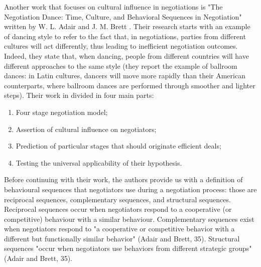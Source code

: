 \documentclass[../main.tex]{subfiles}
\begin{document}
Another work that focuses on cultural influence in negotiations is "The Negotiation Dance: Time, Culture, and Behavioral Sequences in Negotiation" written by W. L. Adair and J. M. Brett \cite{adair}. Their research starts with an example of dancing style to refer to the fact that, in negotiations, parties from different cultures will act differently, thus leading to inefficient negotiation outcomes. Indeed, they state that, when dancing, people from different countries will have different approaches to the same style (they report the example of ballroom dances: in Latin cultures, dancers will move more rapidly than their American counterparts, where ballroom dances are performed through smoother and lighter steps). Their work in divided in four main parts:
\begin{enumerate}
\item Four stage negotiation model;
\item Assertion of cultural influence on negotiators;
\item Prediction of particular stages that should originate efficient deals;
\item Testing the universal applicability of their hypothesis.
\end{enumerate}
Before continuing with their work, the authors provide us with a definition of behavioural sequences that negotiators use during a negotiation process: those are reciprocal sequences, complementary sequences, and structural sequences. Reciprocal sequences occur when negotiators respond to a cooperative (or competitive) behaviour with a similar behaviour. Complementary sequences exist when negotiators respond to "a cooperative or competitive behavior with a different but functionally similar behavior" (Adair and Brett, 35). Structural sequences "occur when negotiators use behaviors from different strategic groups" (Adair and Brett, 35).
\end{document}
